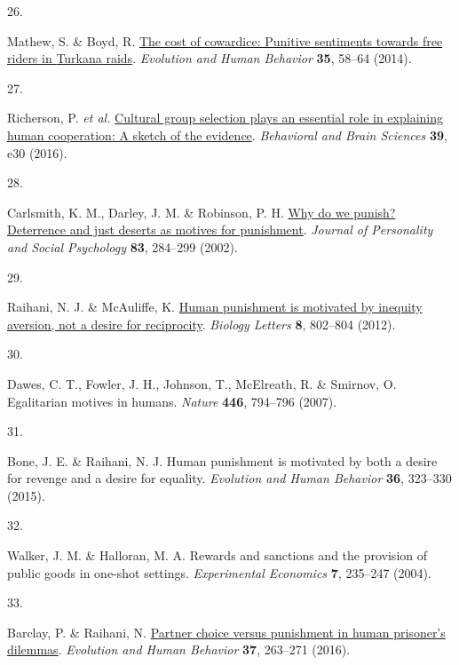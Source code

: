 \documentclass[
  man,floatsintext]{apa6}
\newlength{\cslhangindent}
\newlength{\csllabelwidth}
\newlength{\cslentryspacingunit} %
\newenvironment{CSLReferences}[2] %
 {%
  \setlength{\parindent}{0pt}
  \ifodd #1
  \let\oldpar\par
  \def\par{\hangindent=\cslhangindent\oldpar}
  \fi
  \setlength{\parskip}{#2\cslentryspacingunit}
 }%
 {}
\newcommand{\CSLLeftMargin}[1]{\parbox[t]{\csllabelwidth}{#1}}
\newcommand{\CSLRightInline}[1]{\parbox[t]{\linewidth - \csllabelwidth}{#1}\break}
\begin{document}
\begin{CSLReferences}{0}{0}
\leavevmode{}%
\CSLLeftMargin{26. }%
\CSLRightInline{Mathew, S. \& Boyd, R. \href{https://doi.org/10.1016/j.evolhumbehav.2013.10.001}{The cost of cowardice: Punitive sentiments towards free riders in {Turkana} raids}. \emph{Evolution and Human Behavior} \textbf{35}, 58--64 (2014).}

\leavevmode{}%
\CSLLeftMargin{27. }%
\CSLRightInline{Richerson, P. \emph{et al.} \href{https://doi.org/10.1017/S0140525X1400106X}{Cultural group selection plays an essential role in explaining human cooperation: A sketch of the evidence}. \emph{Behavioral and Brain Sciences} \textbf{39}, e30 (2016).}

\leavevmode{}%
\CSLLeftMargin{28. }%
\CSLRightInline{Carlsmith, K. M., Darley, J. M. \& Robinson, P. H. \href{https://doi.org/10.1037/0022-3514.83.2.284}{Why do we punish? Deterrence and just deserts as motives for punishment}. \emph{Journal of Personality and Social Psychology} \textbf{83}, 284--299 (2002).}

\leavevmode{}%
\CSLLeftMargin{29. }%
\CSLRightInline{Raihani, N. J. \& McAuliffe, K. \href{https://doi.org/10.1098/rsbl.2012.0470}{Human punishment is motivated by inequity aversion, not a desire for reciprocity}. \emph{Biology Letters} \textbf{8}, 802--804 (2012).}

\leavevmode{}%
\CSLLeftMargin{30. }%
\CSLRightInline{Dawes, C. T., Fowler, J. H., Johnson, T., McElreath, R. \& Smirnov, O. Egalitarian motives in humans. \emph{Nature} \textbf{446}, 794--796 (2007).}

\leavevmode{}%
\CSLLeftMargin{31. }%
\CSLRightInline{Bone, J. E. \& Raihani, N. J. Human punishment is motivated by both a desire for revenge and a desire for equality. \emph{Evolution and Human Behavior} \textbf{36}, 323--330 (2015).}

\leavevmode{}%
\CSLLeftMargin{32. }%
\CSLRightInline{Walker, J. M. \& Halloran, M. A. Rewards and sanctions and the provision of public goods in one-shot settings. \emph{Experimental Economics} \textbf{7}, 235--247 (2004).}

\leavevmode{}%
\CSLLeftMargin{33. }%
\CSLRightInline{Barclay, P. \& Raihani, N. \href{https://doi.org/10.1016/j.evolhumbehav.2015.12.004}{Partner choice versus punishment in human prisoner's dilemmas}. \emph{Evolution and Human Behavior} \textbf{37}, 263--271 (2016).}


\end{CSLReferences}
\end{document}
